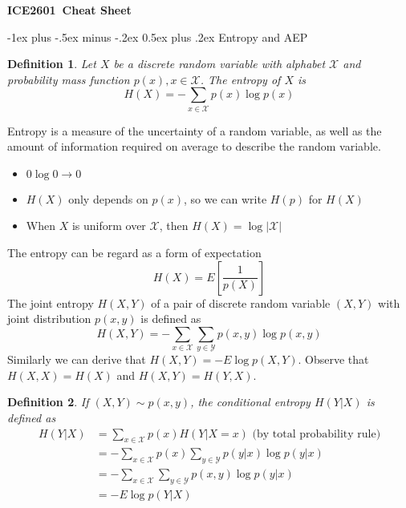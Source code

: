 \documentclass[10pt,landscape, a4paper]{article}
\makeatletter
\newtheorem{definition}{Definition}
\renewcommand{\section}{\@startsection{section}{1}{0mm}%
                                {-1ex plus -.5ex minus -.2ex}%
                                {0.5ex plus .2ex}%
                                {\normalfont\large\bfseries}}
\makeatother
\begin{document}
\raggedright
\footnotesize
\begin{multicols}{3}


\setlength{\premulticols}{1pt}
\setlength{\postmulticols}{1pt}
\setlength{\multicolsep}{1pt}
\setlength{\columnsep}{2pt}

\begin{center}
     \Large{\textbf{ICE2601\ Cheat Sheet}} \\
\end{center}

\section{Entropy and AEP}
\begin{definition}
    Let $X$ be a discrete random variable with alphabet $\mathcal{X}$ and probability mass function $p(x), x\in \mathcal{X}$. The entropy of $X$ is
    $$
    H(X)=-\sum_{x\in\mathcal{X}}p(x)\log p(x)
    $$
\end{definition}
Entropy is a measure of the uncertainty of a random variable, as well as the amount of information required on average to describe the random variable. 

\begin{itemize}
    \item $0\log 0\rightarrow 0$

    \item $H(X)$ only depends on $p(x)$, so we can write $H(p)$ for $H(X)$
    
    \item When $X$ is uniform over $\mathcal{X}$, then $H(X)=\log |\mathcal{X}|$
\end{itemize}

The entropy can be regard as a form of expectation
$$
    H(X)=E\left[\frac{1}{p(X)}\right]
$$
The joint entropy $H(X,Y)$ of a pair of discrete random variable $(X,Y)$ with joint distribution $p(x,y)$ is defined as
$$
H(X,Y)=-\sum_{x\in\mathcal{X}}\sum_{y\in\mathcal{Y}}p(x,y)\log p(x,y)
$$
Similarly we can derive that $H(X,Y)=-E\log p(X,Y)$. Observe that $H(X,X)=H(X)$ and $H(X,Y)=H(Y,X)$.

\begin{definition}
    If $(X,Y)\sim p(x,y)$, the conditional entropy $H(Y|X)$ is defined as
$$
\begin{aligned}
    H(Y|X)&=\sum_{x\in\mathcal{X}}p(x)H(Y|X=x)\text{ (by total probability rule)}\\
    &=-\sum_{x\in\mathcal{X}}p(x)\sum_{y\in\mathcal{Y}}p(y|x)\log p(y|x)\\
    &=-\sum_{x\in\mathcal{X}}\sum_{y\in\mathcal{Y}}p(x,y)\log p(y|x)\\
    &=-E \log p(Y|X)\\
\end{aligned}
$$
\end{definition}


\end{multicols}
\end{document}
